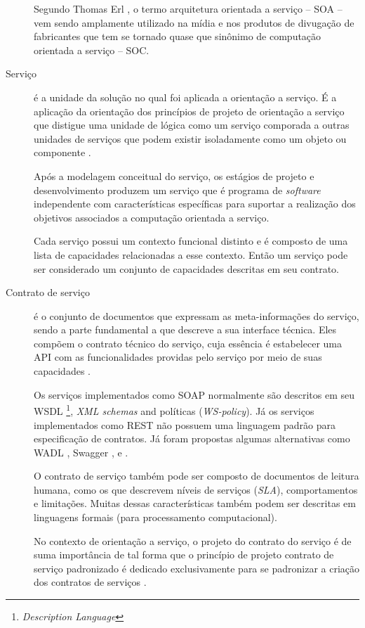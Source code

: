 \begin{description}
Segundo Thomas Erl \cite{erl2009web}, o termo arquitetura orientada a serviço --
SOA -- vem sendo amplamente utilizado na mídia e nos produtos de divugação de
fabricantes que tem se tornado quase que sinônimo de computação orientada a
serviço -- SOC.

\item [Serviço] é a unidade da solução no qual foi aplicada a orientação a
serviço. É a aplicação da orientação dos princípios de projeto de orientação a
serviço que distigue uma unidade de lógica como um serviço comporada a outras
unidades de serviços que podem existir isoladamente como um objeto ou
componente \cite{erl2009web}.

Após a modelagem conceitual do serviço, os estágios de projeto e desenvolvimento
produzem um serviço que é programa de \textit{software} independente com
características específicas para suportar a realização dos objetivos associados
a computação orientada a serviço.

Cada serviço possui um contexto funcional distinto e é composto de uma lista
de capacidades relacionadas a esse contexto. Então um serviço pode ser
considerado um conjunto de capacidades descritas em seu contrato.


\item [Contrato de serviço] é o conjunto de documentos que expressam as
meta-informações do serviço, sendo a parte fundamental a que descreve a
sua interface técnica. Eles compõem o contrato técnico do serviço, cuja essência
é estabelecer uma API com as funcionalidades providas pelo serviço por meio de
suas capacidades \cite{erl2009web}.

Os serviços implementados como \ws SOAP normalmente são descritos em seu WSDL
\footnote{\ws{} \textit{Description Language}}, \textit{XML schemas} and
políticas (\textit{WS-policy}). Já os serviços implementados como \ws{} REST não
possuem uma linguagem padrão para especificação de contratos. Já foram propostas
algumas alternativas como WADL \cite{hadley2006web}, Swagger \cite{swaggerSite},
e \neoidl{} \cite{lima2015neoidl}.

O contrato de serviço também pode ser composto de documentos de leitura humana,
como os que descrevem níveis de serviços (\textit{SLA}), comportamentos e
limitações. Muitas dessas características também podem ser descritas em
linguagens formais (para processamento computacional).

No contexto de orientação a serviço, o projeto do contrato do serviço é de suma
importância de tal forma que o princípio de projeto contrato de serviço
padronizado é dedicado exclusivamente para se padronizar a criação dos contratos
de serviços \cite{erl2009web}.

\end{description}




